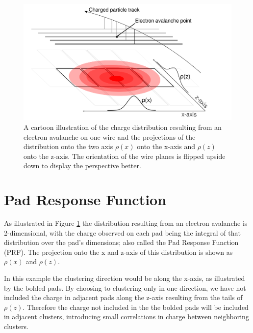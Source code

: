 \documentclass[review]{elsarticle}
\begin{document}
\begin{figure}[H]
\includegraphics[width=\linewidth]{padsat_Large}
\caption{A cartoon illustration of the charge distribution resulting from an electron avalanche on one wire and the projections of the distribution onto the two axis $\rho(x)$ onto the x-axis and $\rho(z)$ onto the z-axis. The orientation of the wire planes is flipped upside down to display the perspective better.}
\label{fig:prf}
\end{figure}

\section{Pad Response Function}
As illustrated in Figure \ref{fig:prf} the distribution resulting from an electron avalanche is 2-dimensional, with the charge observed on each pad being the integral of that distribution over the pad's dimensions; also called the Pad Response Function (PRF). The projection onto the x and z-axis of this distribution is shown as $\rho(x)$ and $\rho(z)$. 

In this example the clustering direction would be along the x-axis, as illustrated by the bolded pads. By choosing to clustering only in one direction, we have not included the charge in adjacent pads along the z-axis resulting from the tails of $\rho(z)$. Therefore the charge not included in the the bolded pads will be included in adjacent clusters, introducing small correlations in charge between neighboring clusters. 
\end{document}
